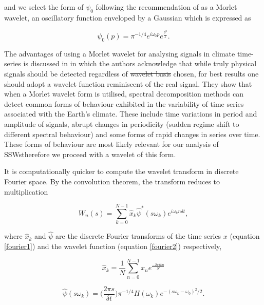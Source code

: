 \documentclass[wcd, manuscript]{copernicus}
\providecommand{\DIFadd}[1]{{\protect\color{blue}\uwave{#1}}} %
\providecommand{\DIFdel}[1]{{\protect\color{red}\sout{#1}}}                      %
\providecommand{\DIFaddbegin}{} %
\providecommand{\DIFaddend}{} %
\providecommand{\DIFdelbegin}{} %
\providecommand{\DIFdelend}{} %
\begin{document}
and we select the form of $\psi_0$ following the recommendation of \cite{Torrence1998} as a Morlet wavelet, an oscillatory function enveloped by a Gaussian which is expressed as

\begin{equation} \label{psi0}
\psi_0(p) = \pi^{-1/4} e^{i\omega_0 p} e^{\frac{p^2}{2}}.
\end{equation}

The advantages of using a Morlet wavelet for analysing signals in climate time-series is discussed in \cite{Lau1995} in which the authors acknowledge that while truly physical signals should be detected regardless of \DIFdelbegin \DIFdel{wavelet basis }\DIFdelend \DIFaddbegin \DIFadd{which wavelet basis is }\DIFaddend chosen, for best results one should adopt a wavelet function reminiscent of the real signal. They show that when a Morlet wavelet form is utilised, spectral decomposition methods can detect common forms of behaviour exhibited in the variability of time series associated with the Earth's climate. These include time variations in period and amplitude of signals, abrupt changes in periodicity (sudden regime shift to different spectral behaviour) and some forms of rapid changes in series over time. These forms of behaviour are most likely relevant for our analysis of SSWs\DIFaddbegin \DIFadd{, }\DIFaddend therefore we proceed with a wavelet of this form. 

It is computationally quicker to compute the wavelet transform in discrete Fourier space. By the convolution theorem, the transform reduces to multiplication

\begin{equation} \label{wavelet_transform2}
W_n(s) = \sum^{N - 1}_{k = 0} \hat{x}_{k} \hat{\psi}^* (s\omega_k) e^{i \omega_k n \delta t},
\end{equation}

where $\hat{x}_{k}$ and $\hat{\psi}$ are the discrete Fourier transforms of the time series $x$ (equation \ref{fourier1}) and the wavelet function (equation \ref{fourier2}) respectively,

\begin{equation} \label{fourier1}
\hat{x}_k = \frac{1}{N} \sum^{N-1}_{n = 0} x_n e^{\frac{-2\pi i k n}{N}}
\end{equation}

\begin{equation} \label{fourier2}
\hat{\psi}(s\omega_k) = \bigg(\frac{2 \pi s}{\delta t}\bigg) \pi^{-1/4}H(\omega_k) e^{-(s\omega_k - \omega_0)^2/2}.
\end{equation}
\end{document}
